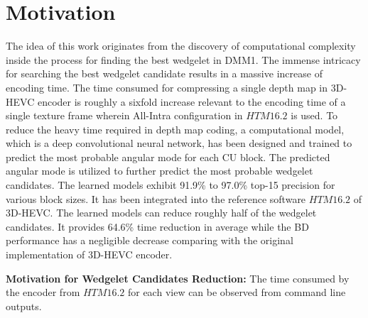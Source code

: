 \section{Motivation}\label{sec:motivation_and_contribution}
The idea of this work originates from the discovery of computational
complexity inside the process for finding the best wedgelet in DMM1.
The immense intricacy for searching the best wedgelet candidate results in
a massive increase of encoding time.
The time consumed for compressing a single depth map in 3D-HEVC encoder is
roughly a sixfold increase relevant to the encoding time of a single texture
frame wherein All-Intra configuration in \(HTM16.2\) is used.
To reduce the heavy time required in depth map coding, 
a computational model, which is a deep convolutional neural network,
has been designed and trained to predict the most probable angular mode
for each CU block.
The predicted angular mode is utilized to further predict the 
most probable wedgelet candidates.
The learned models exhibit 91.9\% to 97.0\% top-15 precision for various
block sizes.
It has been integrated into the reference software
\(HTM16.2\) of 3D-HEVC\@.
The learned models can reduce roughly half of the wedgelet candidates.
It provides 64.6\% time reduction in average while the BD performance
has a negligible decrease comparing with the original
implementation of 3D-HEVC encoder.

\textbf{Motivation for Wedgelet Candidates Reduction:} The time
consumed by the encoder from \(HTM16.2\) for
each view can be observed from command line outputs.

